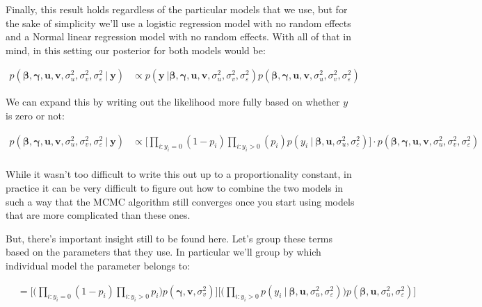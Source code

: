 \documentclass[12pt,twoside]{reedthesis}
\begin{document}
Finally, this result holds regardless of the particular models that we use, but for the sake of simplicity we'll use a logistic regression model with no random effects and a Normal linear regression model with no random effects. With all of that in mind, in this setting our posterior for both models would be:

\[
\begin{aligned}
p(\boldsymbol{\beta}, \boldsymbol{\gamma}, \mathbf{u}, \mathbf{v}, \sigma_u^2, \sigma_v^2, \sigma_{\varepsilon}^2\ | \ \mathbf{y}) &\propto p(\mathbf{y} \ | \boldsymbol{\beta}, \boldsymbol{\gamma}, \mathbf{u}, \mathbf{v}, \sigma_u^2, \sigma_v^2, \sigma_{\varepsilon}^2)p(\boldsymbol{\beta}, \boldsymbol{\gamma}, \mathbf{u}, \mathbf{v}, \sigma_u^2, \sigma_v^2, \sigma_{\varepsilon}^2) 
\end{aligned}
\]

We can expand this by writing out the likelihood more fully based on whether \(y\) is zero or not:

\[
\begin{aligned}
p(\boldsymbol{\beta}, \boldsymbol{\gamma}, \mathbf{u}, \mathbf{v}, \sigma_u^2, \sigma_v^2, \sigma_{\varepsilon}^2 \ | \ \mathbf{y}) & \propto \bigg[\prod_{i:y_i = 0}(1-p_i)\prod_{i:y_i > 0}(p_i)p(y_i \ | \ \boldsymbol{\beta}, \mathbf{u}, \sigma_u^2, \sigma_{\varepsilon}^2)\bigg]\cdot  p(\boldsymbol{\beta}, \boldsymbol{\gamma}, \mathbf{u}, \mathbf{v}, \sigma_u^2, \sigma_v^2, \sigma_{\varepsilon}^2)\\
\end{aligned}
\]

While it wasn't too difficult to write this out up to a proportionality constant, in practice it can be very difficult to figure out how to combine the two models in such a way that the MCMC algorithm still converges once you start using models that are more complicated than these ones.

But, there's important insight still to be found here. Let's group these terms based on the parameters that they use. In particular we'll group by which individual model the parameter belongs to:

\[
\begin{aligned}
&= \Bigg[\Big(\prod_{i:y_i = 0}(1- p_i)\prod_{i: y_i > 0}p_i\Big)p(\boldsymbol{\gamma}, \mathbf{v}, \sigma_v^2)\Bigg]\Bigg[\Big(\prod_{i:y_i > 0}p(y_i \ | \ \boldsymbol{\beta}, \mathbf{u}, \sigma_u^2, \sigma_{\varepsilon}^2)\Big)p(\boldsymbol{\beta},\mathbf{u}, \sigma_u^2, \sigma_{\varepsilon}^2)\Bigg]
\end{aligned}
\]
\end{document}
